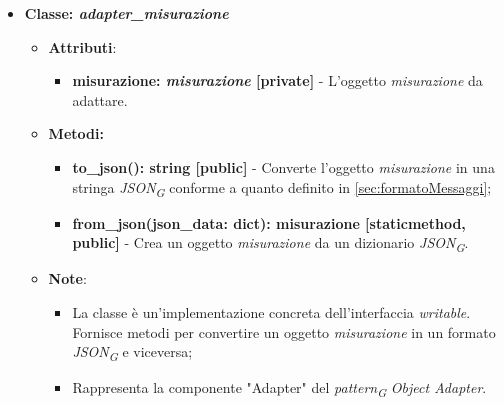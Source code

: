 \begin{itemize}
    \item{\textbf{Classe: \textit{adapter\_misurazione}}}
    \begin{itemize}
        \item\textbf{Attributi}:
        \begin{itemize}
            \item \textbf{misurazione: \textit{misurazione} [private]} - L'oggetto \textit{misurazione} da adattare.
        \end{itemize}
        \item \textbf{Metodi: }
        \begin{itemize}
            \item \textbf{to\_json(): string [public]} - Converte l'oggetto \textit{misurazione} in una stringa \textit{JSON}\textsubscript{\textit{G}} conforme a quanto definito in \ref{sec:formatoMessaggi};
            \item \textbf{from\_json(json\_data: dict): misurazione [staticmethod, public]} - Crea un oggetto \textit{misurazione} da un dizionario \textit{JSON}\textsubscript{\textit{G}}.
        \end{itemize}
        \item\textbf{Note}:
        \begin{itemize}
            \item La classe è un'implementazione concreta dell'interfaccia \textit{writable}. Fornisce metodi per convertire un oggetto \textit{misurazione} in un formato \textit{JSON}\textsubscript{\textit{G}} e viceversa;
            \item Rappresenta la componente "Adapter" del \textit{pattern}\textsubscript{\textit{G}} \textit{Object Adapter}.
        \end{itemize}
    \end{itemize}


\end{itemize}
